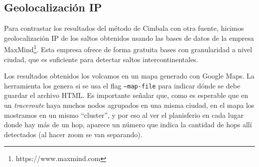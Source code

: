 \subsection{Geolocalización IP}

Para contrastar los resultados del método de Cimbala con otra fuente, hicimos geolocalización IP de los saltos obtenidos usando las bases de datos de la empresa MaxMind\footnote{https://www.maxmind.com}. Esta empresa ofrece de forma gratuita bases con granularidad a nivel ciudad, que es suficiente para detectar saltos intercontinentales.

Los resultados obtenidos los volcamos en un mapa generado con Google Maps. La herramienta los genera si se usa el flag \texttt{--map-file} para indicar dónde se debe guardar el archivo HTML. Es importante señalar que, como es esperable que en un \emph{traceroute} haya muchos nodos agrupados en una misma ciudad, en el mapa los mostramos en un mismo ``cluster'', y por eso al ver el planisferio en cada lugar donde hay más de un hop, aparece un número que indica la cantidad de hops allí detectados (al hacer zoom se van separando).

